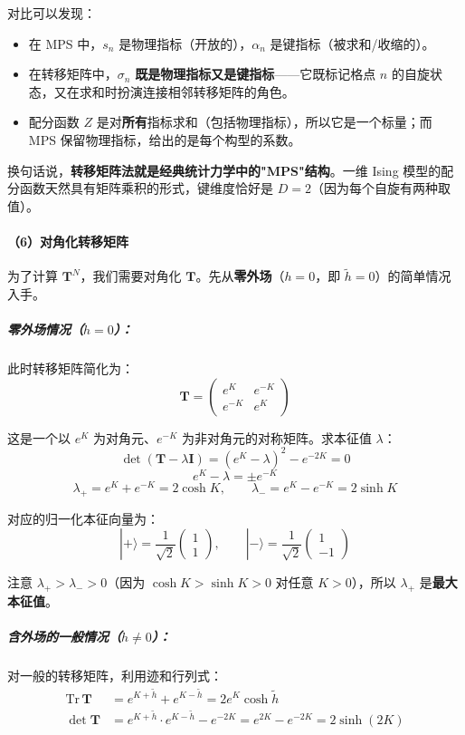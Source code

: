 \documentclass[12pt,a4paper]{ctexart}
\begin{document}
对比可以发现：
\begin{itemize}
    \item 在 MPS 中，$s_n$ 是物理指标（开放的），$\alpha_n$ 是键指标（被求和/收缩的）。
    \item 在转移矩阵中，$\sigma_n$ \textbf{既是物理指标又是键指标}——它既标记格点 $n$ 的自旋状态，又在求和时扮演连接相邻转移矩阵的角色。
    \item 配分函数 $Z$ 是对\textbf{所有}指标求和（包括物理指标），所以它是一个标量；而 MPS 保留物理指标，给出的是每个构型的系数。
\end{itemize}

换句话说，\textbf{转移矩阵法就是经典统计力学中的"MPS"结构}。一维 Ising 模型的配分函数天然具有矩阵乘积的形式，键维度恰好是 $D = 2$（因为每个自旋有两种取值）。

\paragraph{（6）对角化转移矩阵}

为了计算 $\mathbf{T}^N$，我们需要对角化 $\mathbf{T}$。先从\textbf{零外场}（$h = 0$，即 $\tilde{h} = 0$）的简单情况入手。

\subparagraph{零外场情况（$h = 0$）：}
此时转移矩阵简化为：
\[
\mathbf{T} = \begin{pmatrix} e^K & e^{-K} \\ e^{-K} & e^K \end{pmatrix}
\]

这是一个以 $e^K$ 为对角元、$e^{-K}$ 为非对角元的对称矩阵。求本征值 $\lambda$：
\[
\det(\mathbf{T} - \lambda \mathbf{I}) = (e^K - \lambda)^2 - e^{-2K} = 0
\]
\[
e^K - \lambda = \pm e^{-K}
\]
\begin{equation}
\boxed{
\lambda_+ = e^K + e^{-K} = 2\cosh K, \qquad \lambda_- = e^K - e^{-K} = 2\sinh K
}
\end{equation}

对应的归一化本征向量为：
\[
|+\rangle = \frac{1}{\sqrt{2}}\begin{pmatrix} 1 \\ 1 \end{pmatrix}, \qquad |-\rangle = \frac{1}{\sqrt{2}}\begin{pmatrix} 1 \\ -1 \end{pmatrix}
\]

注意 $\lambda_+ > \lambda_- > 0$（因为 $\cosh K > \sinh K > 0$ 对任意 $K > 0$），所以 $\lambda_+$ 是\textbf{最大本征值}。

\subparagraph{含外场的一般情况（$h \neq 0$）：}
对一般的转移矩阵，利用迹和行列式：
\begin{align}
\mathrm{Tr}\,\mathbf{T} &= e^{K+\tilde{h}} + e^{K-\tilde{h}} = 2e^K \cosh\tilde{h} \\
\det\mathbf{T} &= e^{K+\tilde{h}} \cdot e^{K-\tilde{h}} - e^{-2K} = e^{2K} - e^{-2K} = 2\sinh(2K)
\end{align}
\end{document}
